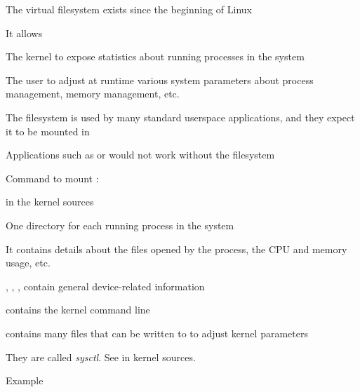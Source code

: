   \startitemize
  \item The  virtual filesystem exists since the beginning of
    Linux
  \item It allows
    \startitemize
    \item The kernel to expose statistics about running processes in
      the system
    \item The user to adjust at runtime various system parameters
      about process management, memory management, etc.
    \stopitemize
  \item The  filesystem is used by many standard userspace
    applications, and they expect it to be mounted in 
  \item Applications such as  or  would not work
    without the  filesystem
  \item Command to mount :\\
  \item {} in the kernel sources
  \item {}
  \stopitemize

  \startitemize
  \item One directory for each running process in the system
    \startitemize
    \item {}
    \item {}
    \item It contains details about the files opened by the process,
      the CPU and memory usage, etc.
    \stopitemize
  \item {}, ,
    ,  contain general
    device-related information
  \item {} contains the kernel command line
  \item {} contains many files that can be written to to
    adjust kernel parameters
    \startitemize
    \item They are called {\em sysctl}. See 
      in kernel sources.
    \item Example\\
    \stopitemize
  \stopitemize

